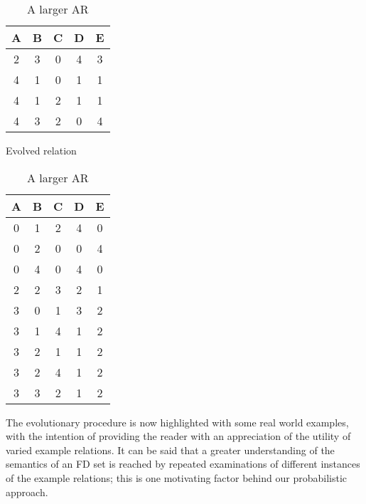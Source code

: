 {\line
\begin{table}[ht]
\begin{minipage}[t]{8cm}
\begin{center}
\begin{tabular}{|c|c|c|c|c|} \hline 
{ \bf A } & { \bf B} & {\bf  C }  & { \bf D }  & {\bf E} \\ \hline
2 & 3 & 0 & 4 & 3 \\
4 & 1 & 0 & 1 & 1 \\
4 & 1 & 2 & 1 & 1 \\
4 & 3 & 2 & 0 & 4 \\  \hline
\end{tabular}
\end{center}
\caption{\label{table:5.3} Evolved relation }
\end{minipage}
\hfill
\begin{minipage}[t]{8cm}
\begin{center}
\begin{tabular}{|c|c|c|c|c|} \hline 
{ \bf A } & { \bf B} & {\bf  C }  & { \bf D }  & {\bf E} \\ \hline
0 & 1 & 2 & 4 & 0 \\
0 & 2 & 0 & 0 & 4 \\
0 & 4 & 0 & 4 & 0 \\
2 & 2 & 3 & 2 & 1 \\
3 & 0 & 1 & 3 & 2 \\
3 & 1 & 4 & 1 & 2 \\
3 & 2 & 1 & 1 & 2 \\
3 & 2 & 4 & 1 & 2 \\
3 & 3 & 2 & 1 & 2 \\ \hline\end{tabular}
\end{center}
\caption{\label{table:5.4} A larger AR }
\end{minipage}
\end{table}
}

The evolutionary procedure is now highlighted with some real world 
examples, with the intention of providing the reader with an 
appreciation of the utility of varied example relations. It
can be said that a greater understanding of the semantics of 
an FD set
is reached by repeated examinations of different instances of the
example relations; this is one motivating factor behind our probabilistic approach.

